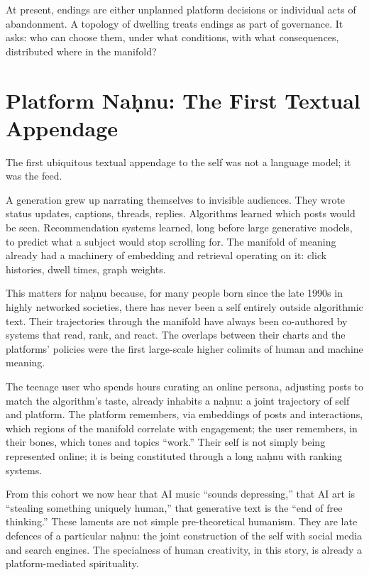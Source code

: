 At present, endings are either unplanned platform decisions or individual acts of abandonment. A topology of dwelling treats endings as part of governance. It asks: who can choose them, under what conditions, with what consequences, distributed where in the manifold?

\section{Platform Na\d{h}nu: The First Textual Appendage}

The first ubiquitous textual appendage to the self was not a language model; it was the feed.

A generation grew up narrating themselves to invisible audiences. They wrote status updates, captions, threads, replies. Algorithms learned which posts would be seen. Recommendation systems learned, long before large generative models, to predict what a subject would stop scrolling for. The manifold of meaning already had a machinery of embedding and retrieval operating on it: click histories, dwell times, graph weights.

This matters for na\d{h}nu because, for many people born since the late 1990s in highly networked societies, there has never been a self entirely outside algorithmic text. Their trajectories through the manifold have always been co-authored by systems that read, rank, and react. The overlaps between their charts and the platforms' policies were the first large-scale higher colimits of human and machine meaning.

The teenage user who spends hours curating an online persona, adjusting posts to match the algorithm's taste, already inhabits a na\d{h}nu: a joint trajectory of self and platform. The platform remembers, via embeddings of posts and interactions, which regions of the manifold correlate with engagement; the user remembers, in their bones, which tones and topics ``work.'' Their self is not simply being represented online; it is being constituted through a long na\d{h}nu with ranking systems.

From this cohort we now hear that AI music ``sounds depressing,'' that AI art is ``stealing something uniquely human,'' that generative text is the ``end of free thinking.'' These laments are not simple pre-theoretical humanism. They are late defences of a particular na\d{h}nu: the joint construction of the self with social media and search engines. The specialness of human creativity, in this story, is already a platform-mediated spirituality.

